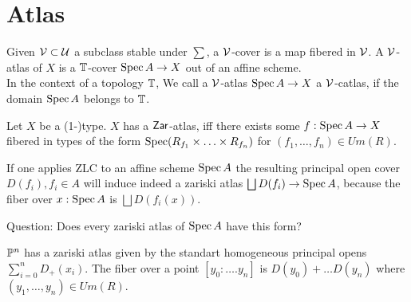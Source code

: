\section{Atlas}
\begin{definition}{\label{def:TAtlas}}
	Given $\mathcal{V} \subset \mathcal{U}$ a subclass stable under $\sum$, a $\mathcal{V}$-cover is a map fibered in $\mathcal{V}$.
	A $\mathcal{V}$-atlas of $X$ is a $\mathbb{T}$-cover $\operatorname{Spec} A \to X$ out of an affine scheme. \\
	In the context of a topology $\mathbb{T}$, We call a $\mathcal{V}$-atlas $\operatorname{Spec} A \to X$ a $\mathcal{V}$-catlas, if the domain $\operatorname{Spec} A$ belongs to $\mathbb{T}$.
\end{definition}


\begin{example}
	Let $X$ be a (1-)type. $X$ has a $\mathsf{Zar}$-atlas, iff there exists some $f : \operatorname{Spec} A \to X$ fibered in types of the form $\operatorname{Spec} (R_{f_1} \times \hdots \times R_{f_n})$ for $(f_1,\hdots,f_n) \in Um(R)$. 
\end{example}
\begin{rmk}{\label{ZLCGivesZariski}}
	If one applies ZLC to an affine scheme $\operatorname{Spec} A$ the resulting principal open cover $D(f_i), f_i \in A$ will induce indeed a zariski atlas $\bigsqcup D(f_i) \to \operatorname{Spec} A$, because the fiber over $x : \operatorname{Spec} A$ is $\bigsqcup D(f_i(x))$.
\end{rmk}
Question: Does every zariski atlas of $\operatorname{Spec} A$ have this form? 

\begin{example}{\label{ex:PnIsStack}}
	$\mathbb{P}^n$ has a zariski atlas given by the standart homogeneous principal opens $\sum_{i=0}^n D_+(x_i)$. The fiber over a point $[y_0 : \hdots . y_n]$ is $D(y_0) + \hdots D(y_n)$ where $(y_1,\hdots,y_n) \in Um(R)$. %
\end{example}


